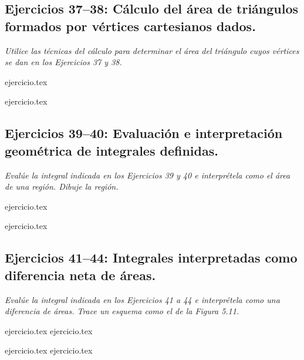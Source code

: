 \subsection*{Ejercicios 37--38: Cálculo del área de triángulos formados por vértices cartesianos dados.}

\noindent \textit{Utilice las técnicas del cálculo para determinar el área del triángulo cuyos vértices se dan en los Ejercicios 37 y 38.}

\begin{enumerate}
    \setcounter{enumi}{36}
    \begin{minipage}{0.45\textwidth}
    {ejercicio.tex}
    \end{minipage}%
    \begin{minipage}{0.45\textwidth}
    {ejercicio.tex}
    \end{minipage}
\end{enumerate}

\subsection*{Ejercicios 39--40: Evaluación e interpretación geométrica de integrales definidas.}

\noindent \textit{Evalúe la integral indicada en los Ejercicios 39 y 40 e interprétela como el área de una región. Dibuje la región.}

\begin{enumerate}
    \setcounter{enumi}{38}
    \begin{minipage}{0.45\textwidth}
    {ejercicio.tex}
    \end{minipage}%
    \begin{minipage}{0.45\textwidth}
    {ejercicio.tex}
    \end{minipage}
\end{enumerate}

\subsection*{Ejercicios 41--44: Integrales interpretadas como diferencia neta de áreas.}

\noindent \textit{Evalúe la integral indicada en los Ejercicios 41 a 44 e interprétela como una diferencia de áreas. Trace un esquema como el de la Figura 5.11.}

\begin{enumerate}
    \setcounter{enumi}{40}
    \begin{minipage}{0.45\textwidth}
    {ejercicio.tex}
    {ejercicio.tex}
    \end{minipage}%
    \begin{minipage}{0.45\textwidth}
    {ejercicio.tex}
    {ejercicio.tex}
    \end{minipage}
\end{enumerate}

